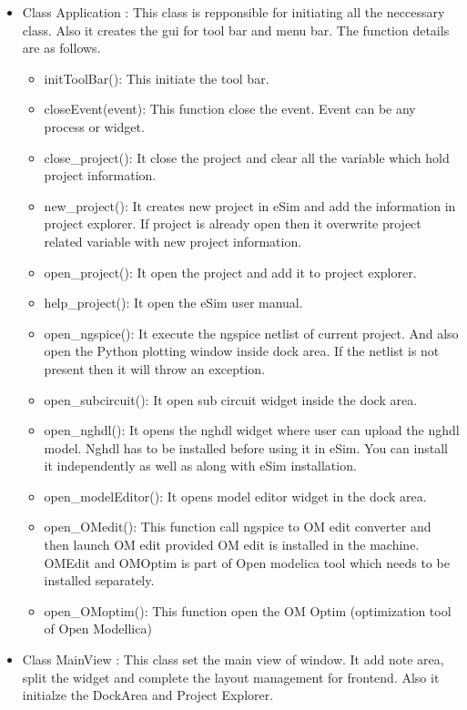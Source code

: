 \documentclass[12pt]{article}
\begin{document}
\begin{itemize}
	\item Class Application : This class is repponsible for initiating all the neccessary class. Also it creates the gui for tool bar and menu bar. The function details are as follows.
	\begin{itemize}
		\item initToolBar(): This initiate the tool bar.
		\item closeEvent(event): This function close the event. Event can be any process or widget.
		\item close\_project(): It close the project and clear all the variable which hold project information.
		\item new\_project(): It creates new project in eSim and add the information in project explorer. If project is already open then it overwrite project related variable with new project information. 
		\item open\_project(): It open the project and add it to project explorer.
		\item help\_project(): It open the eSim user manual.

		\item open\_ngspice(): It execute the ngspice netlist of current project. And also open the Python plotting window inside dock area. If the netlist is not present then it will throw an exception.
		\item open\_subcircuit(): It open sub circuit widget inside the dock area.

		\item open\_nghdl(): It opens the nghdl widget where user can upload the nghdl model. Nghdl has to be installed before using it in eSim. You can install it independently as well as along with eSim installation.
		\item open\_modelEditor(): It opens model editor widget in the dock area.
		\item open\_OMedit(): This function call ngspice to OM edit converter and then launch OM edit provided OM edit is installed in the machine. OMEdit and OMOptim is part of Open modelica tool which needs to be installed separately.
		\item open\_OMoptim(): This function open the OM Optim (optimization tool of Open Modellica)
	\end{itemize}

	\item Class MainView : This class set the main view of window. It add note area, split the widget and complete the layout management for frontend. Also it initialze the DockArea and Project Explorer.
\end{itemize}
\end{document}
